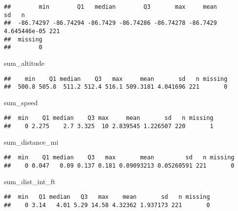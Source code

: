 \documentclass[
]{article}
\newenvironment{Shaded}{\begin{snugshade}}{\end{snugshade}}
\newcommand{\NormalTok}[1]{#1}
\begin{document}
\begin{verbatim}
##        min        Q1   median        Q3       max     mean           sd   n
##  -86.74297 -86.74294 -86.7429 -86.74286 -86.74278 -86.7429 4.645446e-05 221
##  missing
##        0
\end{verbatim}

\begin{Shaded}
\begin{Highlighting}[]
\NormalTok{sum_altitude}
\end{Highlighting}
\end{Shaded}

\begin{verbatim}
##    min    Q1 median    Q3   max     mean       sd   n missing
##  500.8 505.8  511.2 512.4 516.1 509.3181 4.041696 221       0
\end{verbatim}

\begin{Shaded}
\begin{Highlighting}[]
\NormalTok{sum_speed}
\end{Highlighting}
\end{Shaded}

\begin{verbatim}
##  min    Q1 median    Q3 max     mean       sd   n missing
##    0 2.275    2.7 3.325  10 2.839545 1.226507 220       1
\end{verbatim}

\begin{Shaded}
\begin{Highlighting}[]
\NormalTok{sum_distance_mi}
\end{Highlighting}
\end{Shaded}

\begin{verbatim}
##  min    Q1 median    Q3   max       mean         sd   n missing
##    0 0.047   0.09 0.137 0.181 0.09093213 0.05260591 221       0
\end{verbatim}

\begin{Shaded}
\begin{Highlighting}[]
\NormalTok{sum_dist_int_ft}
\end{Highlighting}
\end{Shaded}

\begin{verbatim}
##  min   Q1 median   Q3   max    mean       sd   n missing
##    0 3.14   4.01 5.29 14.58 4.32362 1.937173 221       0
\end{verbatim}
\end{document}
